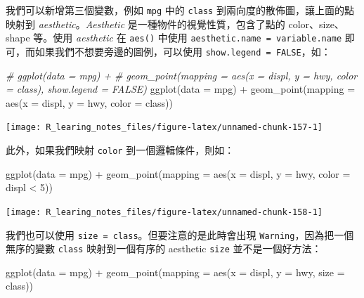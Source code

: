 \documentclass[
]{book}
\newenvironment{Shaded}{\begin{snugshade}}{\end{snugshade}}
\newcommand{\AttributeTok}[1]{\textcolor[rgb]{0.77,0.63,0.00}{#1}}
\newcommand{\CommentTok}[1]{\textcolor[rgb]{0.56,0.35,0.01}{\textit{#1}}}
\newcommand{\DecValTok}[1]{\textcolor[rgb]{0.00,0.00,0.81}{#1}}
\newcommand{\FunctionTok}[1]{\textcolor[rgb]{0.00,0.00,0.00}{#1}}
\newcommand{\NormalTok}[1]{#1}
\newcommand{\SpecialCharTok}[1]{\textcolor[rgb]{0.00,0.00,0.00}{#1}}
\theoremstyle{definition}
\theoremstyle{remark}
\begin{document}
我們可以新增第三個變數，例如 \texttt{mpg} 中的 \texttt{class} 到兩向度的散佈圖，讓上面的點映射到 \emph{aesthetic}。\emph{Aesthetic} 是一種物件的視覺性質，包含了點的 color、size、shape 等。使用 \emph{aesthetic} 在 \texttt{aes()} 中使用 \texttt{aesthetic.name\ =\ variable.name} 即可，而如果我們不想要旁邊的圖例，可以使用 \texttt{show.legend\ =\ FALSE}，如：

\begin{Shaded}
\begin{Highlighting}[]
\CommentTok{\# ggplot(data = mpg) + }
\CommentTok{\#   geom\_point(mapping = aes(x = displ, y = hwy, color = class), show.legend = FALSE)}
\FunctionTok{ggplot}\NormalTok{(}\AttributeTok{data =}\NormalTok{ mpg) }\SpecialCharTok{+} \FunctionTok{geom\_point}\NormalTok{(}\AttributeTok{mapping =} \FunctionTok{aes}\NormalTok{(}\AttributeTok{x =}\NormalTok{ displ, }\AttributeTok{y =}\NormalTok{ hwy, }\AttributeTok{color =}\NormalTok{ class))}
\end{Highlighting}
\end{Shaded}

\begin{center}\texttt{[image: R\_learing\_notes\_files/figure-latex/unnamed-chunk-157-1]} \end{center}

此外，如果我們映射 \texttt{color} 到一個邏輯條件，則如：

\begin{Shaded}
\begin{Highlighting}[]
\FunctionTok{ggplot}\NormalTok{(}\AttributeTok{data =}\NormalTok{ mpg) }\SpecialCharTok{+} \FunctionTok{geom\_point}\NormalTok{(}\AttributeTok{mapping =} \FunctionTok{aes}\NormalTok{(}\AttributeTok{x =}\NormalTok{ displ, }\AttributeTok{y =}\NormalTok{ hwy, }\AttributeTok{color =}\NormalTok{ displ }\SpecialCharTok{\textless{}} \DecValTok{5}\NormalTok{))}
\end{Highlighting}
\end{Shaded}

\begin{center}\texttt{[image: R\_learing\_notes\_files/figure-latex/unnamed-chunk-158-1]} \end{center}

我們也可以使用 \texttt{size\ =\ class}。但要注意的是此時會出現 \texttt{Warning}，因為把一個無序的變數 \texttt{class} 映射到一個有序的 aesthetic \texttt{size} 並不是一個好方法：

\begin{Shaded}
\begin{Highlighting}[]
\FunctionTok{ggplot}\NormalTok{(}\AttributeTok{data =}\NormalTok{ mpg) }\SpecialCharTok{+} \FunctionTok{geom\_point}\NormalTok{(}\AttributeTok{mapping =} \FunctionTok{aes}\NormalTok{(}\AttributeTok{x =}\NormalTok{ displ, }\AttributeTok{y =}\NormalTok{ hwy, }\AttributeTok{size =}\NormalTok{ class))}
\end{Highlighting}
\end{Shaded}
\end{document}
